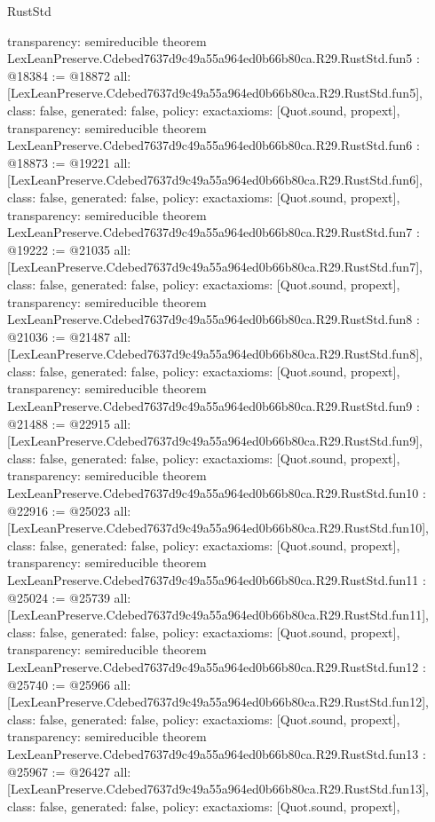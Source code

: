 \begin{lexlean}{RustStd}
\begin{coremodule}
{  transparency: semireducible
}
theorem LexLeanPreserve.Cdebed7637d9c49a55a964ed0b66b80ca.R29.RustStd.fun5 : @18384 := @18872 {
  all: [LexLeanPreserve.Cdebed7637d9c49a55a964ed0b66b80ca.R29.RustStd.fun5],
  class: false,
  generated: false,
  policy: exact{axioms: [Quot.sound, propext]},
  transparency: semireducible
}
theorem LexLeanPreserve.Cdebed7637d9c49a55a964ed0b66b80ca.R29.RustStd.fun6 : @18873 := @19221 {
  all: [LexLeanPreserve.Cdebed7637d9c49a55a964ed0b66b80ca.R29.RustStd.fun6],
  class: false,
  generated: false,
  policy: exact{axioms: [Quot.sound, propext]},
  transparency: semireducible
}
theorem LexLeanPreserve.Cdebed7637d9c49a55a964ed0b66b80ca.R29.RustStd.fun7 : @19222 := @21035 {
  all: [LexLeanPreserve.Cdebed7637d9c49a55a964ed0b66b80ca.R29.RustStd.fun7],
  class: false,
  generated: false,
  policy: exact{axioms: [Quot.sound, propext]},
  transparency: semireducible
}
theorem LexLeanPreserve.Cdebed7637d9c49a55a964ed0b66b80ca.R29.RustStd.fun8 : @21036 := @21487 {
  all: [LexLeanPreserve.Cdebed7637d9c49a55a964ed0b66b80ca.R29.RustStd.fun8],
  class: false,
  generated: false,
  policy: exact{axioms: [Quot.sound, propext]},
  transparency: semireducible
}
theorem LexLeanPreserve.Cdebed7637d9c49a55a964ed0b66b80ca.R29.RustStd.fun9 : @21488 := @22915 {
  all: [LexLeanPreserve.Cdebed7637d9c49a55a964ed0b66b80ca.R29.RustStd.fun9],
  class: false,
  generated: false,
  policy: exact{axioms: [Quot.sound, propext]},
  transparency: semireducible
}
theorem LexLeanPreserve.Cdebed7637d9c49a55a964ed0b66b80ca.R29.RustStd.fun10 : @22916 := @25023 {
  all: [LexLeanPreserve.Cdebed7637d9c49a55a964ed0b66b80ca.R29.RustStd.fun10],
  class: false,
  generated: false,
  policy: exact{axioms: [Quot.sound, propext]},
  transparency: semireducible
}
theorem LexLeanPreserve.Cdebed7637d9c49a55a964ed0b66b80ca.R29.RustStd.fun11 : @25024 := @25739 {
  all: [LexLeanPreserve.Cdebed7637d9c49a55a964ed0b66b80ca.R29.RustStd.fun11],
  class: false,
  generated: false,
  policy: exact{axioms: [Quot.sound, propext]},
  transparency: semireducible
}
theorem LexLeanPreserve.Cdebed7637d9c49a55a964ed0b66b80ca.R29.RustStd.fun12 : @25740 := @25966 {
  all: [LexLeanPreserve.Cdebed7637d9c49a55a964ed0b66b80ca.R29.RustStd.fun12],
  class: false,
  generated: false,
  policy: exact{axioms: [Quot.sound, propext]},
  transparency: semireducible
}
theorem LexLeanPreserve.Cdebed7637d9c49a55a964ed0b66b80ca.R29.RustStd.fun13 : @25967 := @26427 {
  all: [LexLeanPreserve.Cdebed7637d9c49a55a964ed0b66b80ca.R29.RustStd.fun13],
  class: false,
  generated: false,
  policy: exact{axioms: [Quot.sound, propext]},
}
\end{coremodule}
\end{lexlean}
